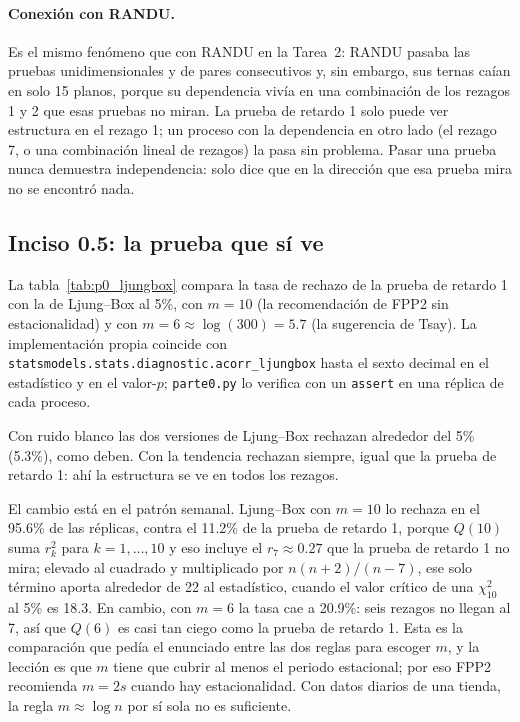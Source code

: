 \paragraph{Conexión con RANDU.} Es el mismo fenómeno que con RANDU en la
Tarea~2: RANDU pasaba las pruebas unidimensionales y de pares consecutivos y,
sin embargo, sus ternas caían en solo 15 planos, porque su dependencia vivía en
una combinación de los rezagos 1 y 2 que esas pruebas no miran. La prueba de
retardo 1 solo puede ver estructura en el rezago 1; un proceso con la
dependencia en otro lado (el rezago 7, o una combinación lineal de rezagos)
la pasa sin problema. Pasar una prueba nunca demuestra independencia: solo
dice que en la dirección que esa prueba mira no se encontró nada.

\subsection{Inciso 0.5: la prueba que sí ve}

La tabla~\ref{tab:p0_ljungbox} compara la tasa de rechazo de la prueba de
retardo 1 con la de Ljung--Box al 5\%, con $m=10$ (la recomendación de FPP2
sin estacionalidad) y con $m=6\approx\log(300)=5.7$ (la sugerencia de Tsay).
La implementación propia coincide con
\nolinkurl{statsmodels.stats.diagnostic.acorr_ljungbox} hasta el sexto decimal
en el estadístico y en el valor-$p$; \texttt{parte0.py} lo verifica con un
\texttt{assert} en una réplica de cada proceso.

\begin{table}[H]
  \centering
  \small
  \caption{Tasa de rechazo al 5\% sobre 5\,000 réplicas, $n=300$. Promedio
  (error estándar).}
  \label{tab:p0_ljungbox}
\end{table}

Con ruido blanco las dos versiones de Ljung--Box rechazan alrededor del 5\%
(5.3\%), como deben. Con la tendencia rechazan siempre, igual que la prueba de
retardo 1: ahí la estructura se ve en todos los rezagos.

El cambio está en el patrón semanal. Ljung--Box con $m=10$ lo rechaza en el
95.6\% de las réplicas, contra el 11.2\% de la prueba de retardo 1, porque
$Q(10)$ suma $r_k^2$ para $k=1,\dots,10$ y eso incluye el $r_7\approx0.27$
que la prueba de retardo 1 no mira; elevado al cuadrado y multiplicado por
$n(n+2)/(n-7)$, ese solo término aporta alrededor de 22 al estadístico, cuando
el valor crítico de una $\chi^2_{10}$ al 5\% es 18.3. En cambio, con $m=6$ la
tasa cae a 20.9\%: seis rezagos no llegan al 7, así que $Q(6)$ es casi tan
ciego como la prueba de retardo 1. Esta es la comparación que pedía el
enunciado entre las dos reglas para escoger $m$, y la lección es que $m$ tiene
que cubrir al menos el periodo estacional; por eso FPP2 recomienda $m=2s$
cuando hay estacionalidad. Con datos diarios de una tienda, la regla
$m\approx\log n$ por sí sola no es suficiente.
